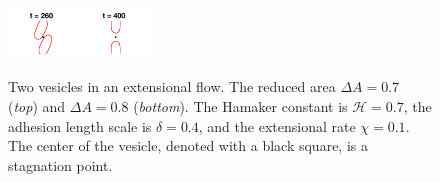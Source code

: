 \documentclass[prf,superscriptaddress,showpacs]{revtex4-1}
\begin{document}
\begin{figure}
  \includegraphics[width = 0.16\textwidth,trim={4cm 2cm 4cm 1cm},clip]{figs/extensional_adR4em1adS7em1Chi1em1_ra080_image04.png}
  \includegraphics[width = 0.16\textwidth,trim={4cm 2cm 4cm 1cm},clip]{figs/extensional_adR4em1adS7em1Chi1em1_ra080_image05.png}
  \caption{\label{fig:extensional3} Two vesicles in an extensional flow.
  The reduced area $\Delta A = 0.7$ ({\em top}) and $\Delta A=0.8$ ({\em bottom}). The Hamaker constant is $\mathcal{H} =
  0.7$, the adhesion length scale is $\delta = 0.4$, and the extensional
  rate $\chi = 0.1$.  The center of the vesicle, denoted with a black
  square, is a stagnation point.}
  \end{figure}
\end{document}
